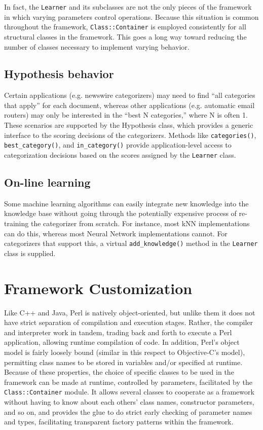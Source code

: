 \documentclass[a4paper,twocolumn]{article}
\begin{document}
In fact, the \texttt{Learner} and its subclasses are not the only pieces of the framework in which varying parameters control operations.  Because this situation is common throughout the framework, \texttt{Class::Container} is employed consistently for all structural classes in the framework.  This goes a long way toward reducing the number of classes necessary to implement varying behavior.

\subsection{Hypothesis behavior}
Certain applications (e.g. newswire categorizers) may need to find ``all categories that apply'' for each document, whereas other applications (e.g. automatic email routers) may only be interested in the ``best N categories,'' where N is often 1.  These scenarios are supported by the Hypothesis class, which provides a generic interface to the scoring decisions of the categorizers.  Methods like \texttt{categories()}, \texttt{best\_category()}, and \texttt{in\_category()} provide application-level access to categorization decisions based on the scores assigned by the \texttt{Learner} class.

\subsection{On-line learning}
Some machine learning algorithms can easily integrate new knowledge into the knowledge base without going through the potentially expensive process of re-training the categorizer from scratch.  For instance, most kNN implementations can do this, whereas most Neural Network implementations cannot.  For categorizers that support this, a virtual \texttt{add\_knowledge()} method in the \texttt{Learner} class is supplied.


\section{Framework Customization}

Like C++ and Java, Perl is natively object-oriented, but unlike them it does not have strict separation of compilation and execution stages.  Rather, the compiler and interpreter work in tandem, trading back and forth to execute a Perl application, allowing runtime compilation of code.  In addition, Perl's object model is fairly loosely bound (similar in this respect to Objective-C's model), permitting class names to be stored in variables and/or specified at runtime.  Because of these properties, the choice of specific classes to be used in the framework can be made at runtime, controlled by parameters, facilitated by the \texttt{Class::Container} module.  It allows several classes to cooperate as a framework without having to know about each others' class names, constructor parameters, and so on, and provides the glue to do strict early checking of parameter names and types, facilitating transparent factory patterns within the framework.
\end{document}
